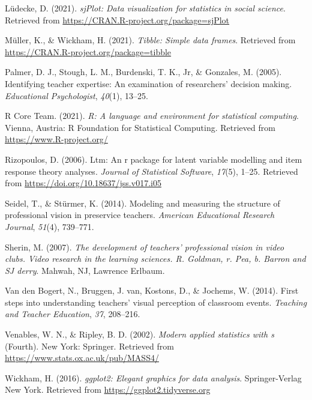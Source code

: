 \documentclass[
  man,floatsintext]{apa6}
\newlength{\cslhangindent}
\newlength{\cslentryspacingunit} %
\newenvironment{CSLReferences}[2] %
 {%
  \setlength{\parindent}{0pt}
  \ifodd #1
  \let\oldpar\par
  \def\par{\hangindent=\cslhangindent\oldpar}
  \fi
  \setlength{\parskip}{#2\cslentryspacingunit}
 }%
 {}
\begin{document}
\begin{CSLReferences}{1}{0}
\leavevmode{}%
Lüdecke, D. (2021). \emph{sjPlot: Data visualization for statistics in social science}. Retrieved from \url{https://CRAN.R-project.org/package=sjPlot}

\leavevmode{}%
Müller, K., \& Wickham, H. (2021). \emph{Tibble: Simple data frames}. Retrieved from \url{https://CRAN.R-project.org/package=tibble}

\leavevmode{}%
Palmer, D. J., Stough, L. M., Burdenski, T. K., Jr, \& Gonzales, M. (2005). Identifying teacher expertise: An examination of researchers' decision making. \emph{Educational Psychologist}, \emph{40}(1), 13--25.

\leavevmode{}%
R Core Team. (2021). \emph{R: A language and environment for statistical computing}. Vienna, Austria: R Foundation for Statistical Computing. Retrieved from \url{https://www.R-project.org/}

\leavevmode{}%
Rizopoulos, D. (2006). Ltm: An r package for latent variable modelling and item response theory analyses. \emph{Journal of Statistical Software}, \emph{17}(5), 1--25. Retrieved from \url{https://doi.org/10.18637/jss.v017.i05}

\leavevmode{}%
Seidel, T., \& Stürmer, K. (2014). Modeling and measuring the structure of professional vision in preservice teachers. \emph{American Educational Research Journal}, \emph{51}(4), 739--771.

\leavevmode{}%
Sherin, M. (2007). \emph{The development of teachers' professional vision in video clubs. Video research in the learning sciences. R. Goldman, r. Pea, b. Barron and SJ derry}. Mahwah, NJ, Lawrence Erlbaum.

\leavevmode{}%
Van den Bogert, N., Bruggen, J. van, Kostons, D., \& Jochems, W. (2014). First steps into understanding teachers' visual perception of classroom events. \emph{Teaching and Teacher Education}, \emph{37}, 208--216.

\leavevmode{}%
Venables, W. N., \& Ripley, B. D. (2002). \emph{Modern applied statistics with s} (Fourth). New York: Springer. Retrieved from \url{https://www.stats.ox.ac.uk/pub/MASS4/}

\leavevmode{}%
Wickham, H. (2016). \emph{ggplot2: Elegant graphics for data analysis}. Springer-Verlag New York. Retrieved from \url{https://ggplot2.tidyverse.org}


\end{CSLReferences}
\end{document}
